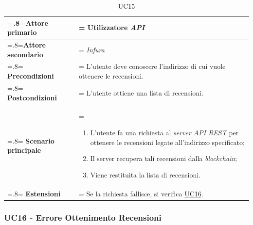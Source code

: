             \begin{table}[H]
                \centering
                \renewcommand{\arraystretch}{1.8}
                \renewcommand\tabularxcolumn[1]{m{#1}}
                \begin{tabularx}{0.9\textwidth} {
                    >{\hsize=.8\hsize\linewidth=\hsize}X
                    >{\hsize=1.2\hsize\linewidth=\hsize}X}
                \hline
                \textbf{Attore primario} & Utilizzatore \textit{API} \\
                \hline
                \textbf{Attore secondario} & \textit{Infura} \\
                \hline
                \textbf{Precondizioni} & L'utente deve conoscere l'indirizzo di cui vuole ottenere le recensioni. \\
                \hline
                \textbf{Postcondizioni} & L'utente ottiene una lista di recensioni. \\
                \hline
                \textbf{Scenario principale} &
                    \begin{enumerate}
                        \item L'utente fa una richiesta al \textit{server API REST} per ottenere le recensioni legate all'indirizzo specificato;
                        \item Il server recupera tali recensioni dalla \textit{blockchain};
                        \item Viene restituita la lista di recensioni.
                    \end{enumerate} \\
                \hline
                \textbf{Estensioni} & Se la richiesta fallisce, si verifica \hyperref[UC16]{UC16}. \\
                \hline
                \end{tabularx}
                \caption{UC15}
            \end{table}

        \subsubsection{UC16 - Errore Ottenimento Recensioni}
        \label{UC16}

